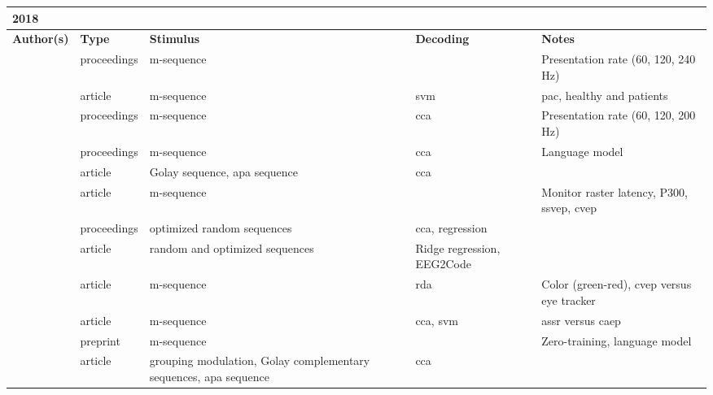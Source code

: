 \documentclass[a4paper,landscape]{article}
\begin{document}
\begin{table}[H]
	\begin{tabular}{p{5cm}p{2cm}p{5cm}p{5cm}p{6.5cm}}
		\textbf{2018} & & & & \\
		\toprule
		\textbf{Author(s)} & \textbf{Type} & \textbf{Stimulus} & \textbf{Decoding} & \textbf{Notes} \\
		\midrule
		\citeauthor{basaklar2018} & proceedings & m-sequence & & Presentation rate (60, 120, 240 Hz) \\
		\citeauthor{dimitriadis2018} & article & m-sequence & \acrshort{svm} & \acrshort{pac}, healthy and patients \\
		\citeauthor{gembler2018a} & proceedings & m-sequence & \acrshort{cca} & Presentation rate (60, 120, 200 Hz) \\
		\citeauthor{gembler2018b} & proceedings & m-sequence & \acrshort{cca} & Language model \\
		\citeauthor{liu2018} & article & Golay sequence, \acrshort{apa} sequence & \acrshort{cca} & \\
		\citeauthor{nagel2018a}  & article & m-sequence & & Monitor raster latency,  P300, \acrshort{ssvep}, \acrshort{cvep} \\
		\citeauthor{nagel2018b} & proceedings & optimized random sequences & \acrshort{cca}, regression & \\
		\citeauthor{nagel2018c} & article & random and optimized sequences & Ridge regression, EEG2Code & \\
		\citeauthor{nezamfar2018} & article & m-sequence & \acrshort{rda} & Color (green-red), \acrshort{cvep} versus eye tracker \\
		\citeauthor{spuler2018} & article & m-sequence & \acrshort{cca},  \acrshort{svm} & \acrshort{assr} versus \acrshort{caep} \\
		\citeauthor{turi2018} & preprint & m-sequence & & Zero-training, language model \\
		\citeauthor{wei2018} & article & grouping modulation, Golay complementary sequences, \acrshort{apa} sequence & \acrshort{cca} & \\
		\bottomrule
	\end{tabular}
\end{table}
\end{document}
